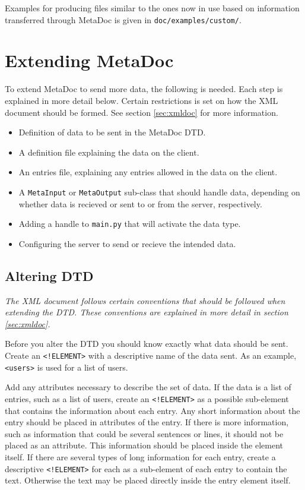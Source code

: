 \documentclass[titlepage, a4paper,10pt]{article}
\begin{document}
Examples for producing files similar to the ones now in use based on
information transferred through MetaDoc is given in
\texttt{doc/examples/custom/}.

\newpage
\section{Extending MetaDoc}
To extend MetaDoc to send more data, the following is needed. Each step is 
explained in more detail below. Certain restrictions is set on how the XML
document should be formed. See section \ref{sec:xmldoc} for more information.

\begin{itemize}
    \item
        Definition of data to be sent in the MetaDoc DTD.
    \item
        A definition file explaining the data on the client.
    \item
        An entries file, explaining any entries allowed in the data on the 
        client.
    \item
        A \texttt{MetaInput} or \texttt{MetaOutput} sub-class that should
        handle data, depending on whether data is recieved or sent to or from
        the server, respectively.
    \item
        Adding a handle to \texttt{main.py} that will activate the data type.
    \item
        Configuring the server to send or recieve the intended data.
\end{itemize}

\subsection{Altering DTD}
\textit{The XML document follows certain conventions that should be followed when
extending the DTD. These conventions are explained in more detail in section
\ref{sec:xmldoc}.}

Before you alter the DTD you should know exactly what data should be sent.
Create an \texttt{<!ELEMENT>} with a descriptive name of the data sent. As an
example, \texttt{<users>} is used for a list of users. 

Add any attributes necessary to describe the set of data. If the data is a list
of entries, such as a list of users, create an \texttt{<!ELEMENT>} as a
possible sub-element that contains the information about each entry. Any short
information about the entry should be placed in attributes of the entry. If
there is more information, such as information that could be several sentences
or lines, it should not be placed as an attribute. This information should be
placed inside the element itself. If there are several types of long
information for each entry, create a descriptive \texttt{<!ELEMENT>} for each
as a sub-element of each entry to contain the text. Otherwise the text may be
placed directly inside the entry element itself. 
\end{document}
